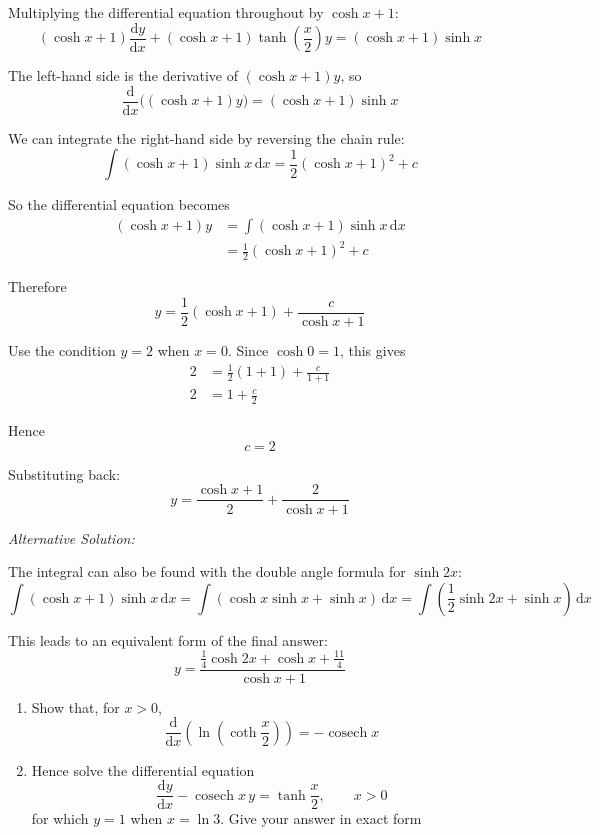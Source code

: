 \documentclass[leqno]{article}
\begin{document}
\begin{enumerate}[
  label=\textbf{\arabic*.},
  leftmargin=*,
  topsep=0pt,
  partopsep=0pt,
  parsep=0pt
]
\begin{djsSolution}
\begin{enumerate}[label=\textbf{(\alph*)}]
Multiplying the differential equation throughout by \(\cosh x+1\):
\[
(\cosh x+1)\frac{\mathrm{d}y}{\mathrm{d}x}+(\cosh x+1)\tanh\left(\frac{x}{2}\right)y=(\cosh x+1)\sinh x
\]

The left-hand side is the derivative of \((\cosh x+1)y\), so
\[
\frac{\mathrm{d}}{\mathrm{d}x}\bigl((\cosh x+1)y\bigr)=(\cosh x+1)\sinh x
\]

We can integrate the right-hand side by reversing the chain rule:
\[
\int (\cosh x+1)\sinh x \,\mathrm{d}x=\frac{1}{2}(\cosh x+1)^2+c
\]

So the differential equation becomes
\begin{align*}
(\cosh x+1)y
&=\int (\cosh x+1)\sinh x \,\mathrm{d}x\\
&=\frac{1}{2}(\cosh x+1)^2+c
\end{align*}

Therefore
\[
y=\frac{1}{2}(\cosh x+1)+\frac{c}{\cosh x+1}
\]

Use the condition \(y=2\) when \(x=0\). Since \(\cosh 0=1\), this gives
\begin{align*}
2&=\frac{1}{2}(1+1)+\frac{c}{1+1} \\
2&=1+\frac{c}{2}
\end{align*}

Hence
\[
c=2
\]

Substituting back:
\[
y=\frac{\cosh x+1}{2}+\frac{2}{\cosh x+1}
\]

\textit{Alternative Solution:}

The integral can also be found with the double angle formula for \(\sinh 2x\):
\[
\int (\cosh x + 1)\sinh x \,\mathrm{d}x = \int (\cosh x\sinh x + \sinh x) \,\mathrm{d}x = \int \left(\frac{1}{2}\sinh 2x + \sinh x\right)\,\mathrm{d}x
\]

This leads to an equivalent form of the final answer:
\[
y = \frac{\frac{1}{4}\cosh 2x + \cosh x + \frac{11}{4}}{\cosh x + 1}
\]
  \end{enumerate}
\end{djsSolution}


\newpage

\questionitem

\begin{enumerate}[label=\textbf{(\alph*)}]
  \item Show that, for $x>0$,
  \[
  \frac{\mathrm{d}}{\mathrm{d}x}\!\left(\ln\!\left(\coth \frac{x}{2}\right)\right)=-\operatorname{cosech} x
  \]
  \item Hence solve the differential equation
  \[
  \frac{\mathrm{d}y}{\mathrm{d}x}-\operatorname{cosech} x\,y=\tanh \frac{x}{2},\qquad x>0
  \]
  for which $y=1$ when $x=\ln 3$. Give your answer in exact form  \\
\end{enumerate}


\end{enumerate}
\end{document}

